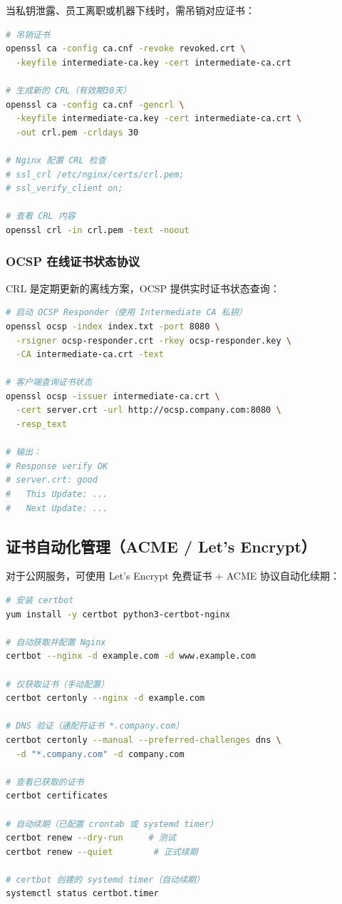 \documentclass[12pt,UTF8]{ctexbook}
\begin{document}
当私钥泄露、员工离职或机器下线时，需吊销对应证书：

\begin{lstlisting}[language=bash]
# 吊销证书
openssl ca -config ca.cnf -revoke revoked.crt \
  -keyfile intermediate-ca.key -cert intermediate-ca.crt

# 生成新的 CRL（有效期30天）
openssl ca -config ca.cnf -gencrl \
  -keyfile intermediate-ca.key -cert intermediate-ca.crt \
  -out crl.pem -crldays 30

# Nginx 配置 CRL 检查
# ssl_crl /etc/nginx/certs/crl.pem;
# ssl_verify_client on;

# 查看 CRL 内容
openssl crl -in crl.pem -text -noout
\end{lstlisting}

\subsubsection*{OCSP 在线证书状态协议}

CRL 是定期更新的离线方案，OCSP 提供实时证书状态查询：

\begin{lstlisting}[language=bash]
# 启动 OCSP Responder（使用 Intermediate CA 私钥）
openssl ocsp -index index.txt -port 8080 \
  -rsigner ocsp-responder.crt -rkey ocsp-responder.key \
  -CA intermediate-ca.crt -text

# 客户端查询证书状态
openssl ocsp -issuer intermediate-ca.crt \
  -cert server.crt -url http://ocsp.company.com:8080 \
  -resp_text

# 输出：
# Response verify OK
# server.crt: good
#   This Update: ...
#   Next Update: ...
\end{lstlisting}

\subsection{证书自动化管理（ACME / Let's Encrypt）}
\label{subsec:acme-automation}

对于公网服务，可使用 Let's Encrypt 免费证书 + ACME 协议自动化续期：

\begin{lstlisting}[language=bash]
# 安装 certbot
yum install -y certbot python3-certbot-nginx

# 自动获取并配置 Nginx
certbot --nginx -d example.com -d www.example.com

# 仅获取证书（手动配置）
certbot certonly --nginx -d example.com

# DNS 验证（通配符证书 *.company.com）
certbot certonly --manual --preferred-challenges dns \
  -d "*.company.com" -d company.com

# 查看已获取的证书
certbot certificates

# 自动续期（已配置 crontab 或 systemd timer）
certbot renew --dry-run     # 测试
certbot renew --quiet        # 正式续期

# certbot 创建的 systemd timer（自动续期）
systemctl status certbot.timer
\end{lstlisting}
\end{document}
